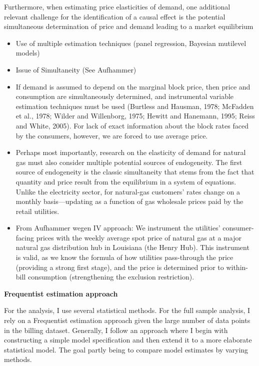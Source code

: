 \documentclass[12pt,twoside]{reedthesis}
\begin{document}
Furthermore, when estimating price elasticities of demand, one additional relevant challenge for the identification of a causal effect is the potential simultaneous determination of price and demand leading to a market equilibrium
\begin{itemize}
\item
  Use of multiple estimation techniques (panel regression, Bayesian mutilevel models)
\item
  Issue of Simultaneity (See Aufhammer)
\item
  If demand is assumed to depend on the marginal block price, then price and consumption are simultaneously determined, and instrumental variable estimation techniques must be used (Burtless and Hausman, 1978; McFadden et al., 1978; Wilder and Willenborg, 1975; Hewitt and Hanemann, 1995; Reiss and White, 2005). For lack of exact information about the block rates faced by the consumers, however, we are forced to use average price.
\item
  Perhaps most importantly, research on the elasticity of demand for natural gas must also consider multiple potential sources of endogeneity. The first source of endogeneity is the classic simultaneity that stems from the fact that quantity and price result from the equilibrium in a system of equations. Unlike the electricity sector, for natural-gas customers' rates change on a monthly basis---updating as a function of gas wholesale prices paid by the retail utilities.
\item
  From Aufhammer wegen IV approach: We instrument the utilities' consumer-facing prices with the weekly average spot price of natural gas at a major natural gas distribution hub in Louisiana (the Henry Hub). This instrument is valid, as we know the formula of how utilities pass-through the price (providing a strong first stage), and the price is determined prior to within-bill consumption (strengthening the exclusion restriction).
\end{itemize}
\textbf{Frequentist estimation approach}

For the analysis, I use several statistical methods. For the full sample analysis, I rely on a Frequentist estimation approach given the large number of data points in the billing dataset. Generally, I follow an approach where I begin with constructing a simple model specification and then extend it to a more elaborate statistical model. The goal partly being to compare model estimates by varying methods.
\end{document}
